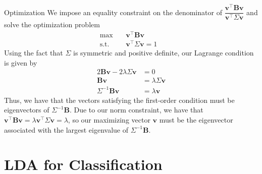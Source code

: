 \documentclass[9pt]{beamer}
\newcommand{\ve}[1]{\mathbf{#1}}
\begin{document}
\begin{frame}{Optimization}
We impose an equality constraint on the denominator of $\dfrac{\ve{v}^\top\ve{B}\ve{v}}{\ve{v}^\top\Sigma\ve{v}}$ and solve the optimization problem
$$
\begin{array}{rcll}
\max &~& \ve{v}^{\top}\ve{B}\ve{v} & \\
\mathrm{s.t.} &~& \ve{v}^{\top}\Sigma\ve{v} = 1
\end{array}
$$
Using the fact that $\Sigma$ is symmetric and positive definite, our Lagrange condition is given by 
\begin{align*}
    2\ve{B}\ve{v} - 2\lambda\Sigma\ve{v} &= 0 \\
    \ve{B}\ve{v} &= \lambda\Sigma\ve{v} \\
    \Sigma^{-1}\ve{B}\ve{v} &= \lambda\ve{v}
\end{align*}
Thus, we have that the vectors satisfying the first-order condition must be eigenvectors of $\Sigma^{-1}\ve{B}$. Due to our norm constraint, we have that $\ve{v}^{\top}\ve{B}\ve{v} = \lambda\ve{v}^{\top}\Sigma\ve{v} = \lambda$, so our maximizing vector $\ve{v}$ must be the eigenvector associated with the largest eigenvalue of $\Sigma^{-1}\ve{B}$. 
\end{frame}

\section{LDA for Classification}
\end{document}
